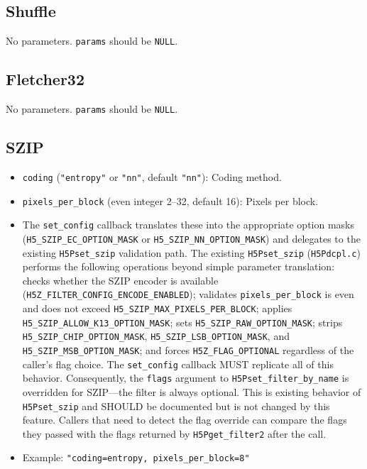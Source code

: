 \documentclass[../HDF5_RFC.tex]{subfiles}
\begin{document}
\subsection{Shuffle}

No parameters. \texttt{params} should be \texttt{NULL}.

\subsection{Fletcher32}

No parameters. \texttt{params} should be \texttt{NULL}.

\subsection{SZIP}

\begin{itemize}
\item \texttt{coding} (\texttt{"entropy"} or \texttt{"nn"}, default \texttt{"nn"}): Coding
  method.
\item \texttt{pixels\_per\_block} (even integer 2--32, default 16): Pixels per block.
\item The \texttt{set\_config} callback translates these into the appropriate option
  masks (\texttt{H5\_SZIP\_EC\_OPTION\_MASK} or \texttt{H5\_SZIP\_NN\_OPTION\_MASK}) and
  delegates to the existing \texttt{H5Pset\_szip} validation path. The existing
  \texttt{H5Pset\_szip} (\texttt{H5Pdcpl.c}) performs the following operations beyond
  simple parameter translation: checks whether the SZIP encoder is available
  (\texttt{H5Z\_FILTER\_CONFIG\_ENCODE\_ENABLED}); validates \texttt{pixels\_per\_block} is
  even and does not exceed \texttt{H5\_SZIP\_MAX\_PIXELS\_PER\_BLOCK}; applies
  \texttt{H5\_SZIP\_ALLOW\_K13\_OPTION\_MASK}; sets \texttt{H5\_SZIP\_RAW\_OPTION\_MASK};
  strips \texttt{H5\_SZIP\_CHIP\_OPTION\_MASK}, \texttt{H5\_SZIP\_LSB\_OPTION\_MASK}, and
  \texttt{H5\_SZIP\_MSB\_OPTION\_MASK}; and forces \texttt{H5Z\_FLAG\_OPTIONAL} regardless
  of the caller's flag choice. The \texttt{set\_config} callback MUST replicate all
  of this behavior. Consequently, the \texttt{flags} argument to
  \texttt{H5Pset\_filter\_by\_name} is overridden for SZIP---the filter is always
  optional. This is existing behavior of \texttt{H5Pset\_szip} and SHOULD be
  documented but is not changed by this feature. Callers that need to
  detect the flag override can compare the flags they passed with the
  flags returned by \texttt{H5Pget\_filter2} after the call.
\item Example: \texttt{"coding=entropy, pixels\_per\_block=8"}
\end{itemize}
\end{document}
